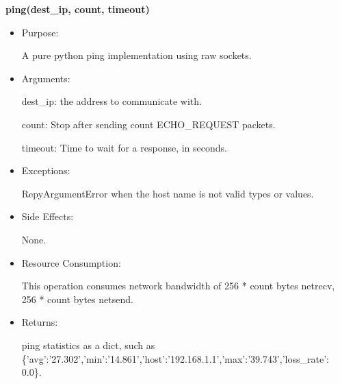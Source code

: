 {\textbf{ping(dest\_ip, count, timeout)}
\begin{itemize}
\item Purpose:

A pure python ping implementation using raw sockets.

\item Arguments:

dest\_ip: the address to communicate with.

count: Stop after sending count ECHO\_REQUEST packets.

timeout: Time to wait for a response, in seconds.

\item Exceptions:

RepyArgumentError when the host name is not valid types or values.

\item Side Effects:

None.

\item Resource Consumption:

This operation consumes network bandwidth of 256 * count bytes netrecv, 256 * count bytes netsend.

\item Returns:

ping statistics as a dict, such as \{'avg':'27.302','min':'14.861','host':'192.168.1.1','max':'39.743','loss\_rate': 0.0\}.
\end{itemize}
\par}